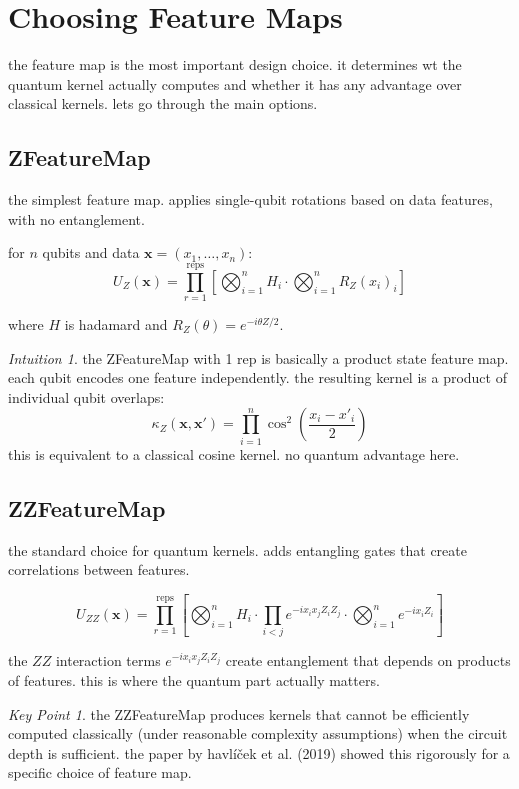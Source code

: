 \documentclass[11pt,a4paper]{article}
\theoremstyle{definition}
\theoremstyle{remark}
\newtheorem*{intuition}{Intuition}
\newtheorem*{keypoint}{Key Point}
\begin{document}
\section{Choosing Feature Maps}

the feature map is the most important design choice. it determines wt the quantum kernel actually computes and whether it has any advantage over classical kernels. lets go through the main options.

\subsection{ZFeatureMap}

the simplest feature map. applies single-qubit rotations based on data features, with no entanglement.

for $n$ qubits and data $\mathbf{x} = (x_1, \ldots, x_n)$:
\[
U_Z(\mathbf{x}) = \prod_{r=1}^{\text{reps}} \left[ \bigotimes_{i=1}^n H_i \cdot \bigotimes_{i=1}^n R_Z(x_i)_i \right]
\]

where $H$ is hadamard and $R_Z(\theta) = e^{-i\theta Z/2}$.

\begin{intuition}
the ZFeatureMap with 1 rep is basically a product state feature map. each qubit encodes one feature independently. the resulting kernel is a product of individual qubit overlaps:
\[
\kappa_Z(\mathbf{x}, \mathbf{x}') = \prod_{i=1}^n \cos^2\!\left(\frac{x_i - x'_i}{2}\right)
\]
this is equivalent to a classical cosine kernel. no quantum advantage here.
\end{intuition}

\subsection{ZZFeatureMap}

the standard choice for quantum kernels. adds entangling gates that create correlations between features.

\[
U_{ZZ}(\mathbf{x}) = \prod_{r=1}^{\text{reps}} \left[ \bigotimes_{i=1}^n H_i \cdot \prod_{i<j} e^{-i x_i x_j Z_i Z_j} \cdot \bigotimes_{i=1}^n e^{-i x_i Z_i} \right]
\]

the $ZZ$ interaction terms $e^{-i x_i x_j Z_i Z_j}$ create entanglement that depends on products of features. this is where the quantum part actually matters.

\begin{keypoint}
the ZZFeatureMap produces kernels that cannot be efficiently computed classically (under reasonable complexity assumptions) when the circuit depth is sufficient. the paper by havl\'i\v{c}ek et al. (2019) showed this rigorously for a specific choice of feature map.
\end{keypoint}
\end{document}
